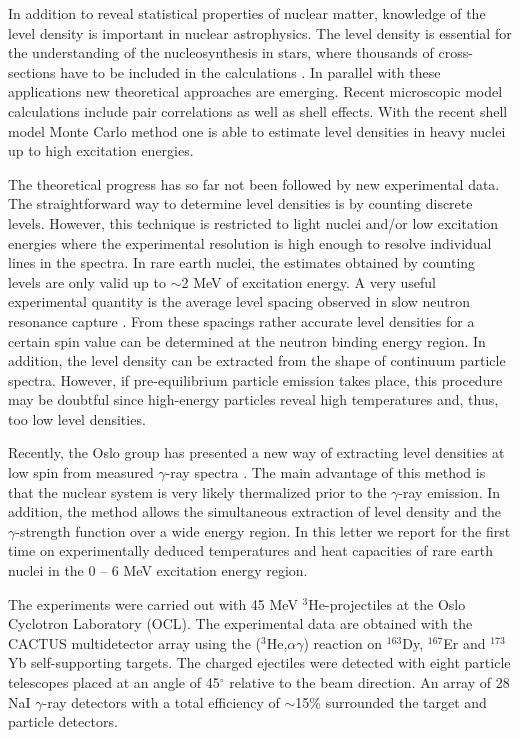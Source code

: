 In addition to reveal statistical properties of nuclear matter, knowledge
of the level density is important in nuclear astrophysics. The level
density is essential for the understanding of the nucleosynthesis in stars,
where thousands of cross-sections have to be included in the calculations
\cite{3}. In parallel with these applications new theoretical approaches
are emerging. Recent microscopic model calculations \cite{3} include pair
correlations as well as shell effects. With the recent shell model Monte
Carlo method \cite{4,5,6,7} one is able to estimate level densities in
heavy nuclei up to high excitation energies.

The theoretical progress has so far not been followed by new experimental
data. The straightforward way to determine level densities is by counting
discrete levels. However, this technique is restricted to light nuclei
and/or low excitation energies where the experimental resolution is high
enough to resolve individual lines in the spectra. In rare earth nuclei,
the estimates obtained by counting levels are only valid up to $\sim$2 MeV
of excitation energy. A very useful experimental quantity is the average
level spacing observed in slow neutron resonance capture \cite{2}. From
these spacings rather accurate level densities for a certain spin value can
be determined at the neutron binding energy region. In addition, the level
density can be extracted from the shape of continuum particle spectra.
However, if pre-equilibrium particle emission takes place, this procedure
may be doubtful since high-energy particles reveal high temperatures and,
thus, too low level densities.

Recently, the Oslo group has presented a new way of extracting level
densities at low spin from measured $\gamma$-ray spectra \cite{8,9}. The
main advantage of this method is that the nuclear system is very likely
thermalized prior to the $\gamma$-ray emission. In addition, the method
allows the simultaneous extraction of level density and the
$\gamma$-strength function over a wide energy region. In this letter we
report for the first time on experimentally deduced temperatures and heat
capacities of rare earth nuclei in the 0 -- 6 MeV excitation energy region.

The experiments were carried out with 45 MeV $^3$He-projectiles at the Oslo
Cyclotron Laboratory (OCL). The experimental data are obtained with the
CACTUS multidetector array \cite{10} using the ($^3$He,$\alpha \gamma$)
reaction on $^{163}$Dy, $^{167}$Er and $^{173}$Yb self-supporting targets.
The charged ejectiles were detected with eight particle telescopes placed
at an angle of 45$^{\circ}$ relative to the beam direction. An array of 28
NaI $\gamma$-ray detectors with a total efficiency of $\sim$15\% surrounded
the target and particle detectors.

